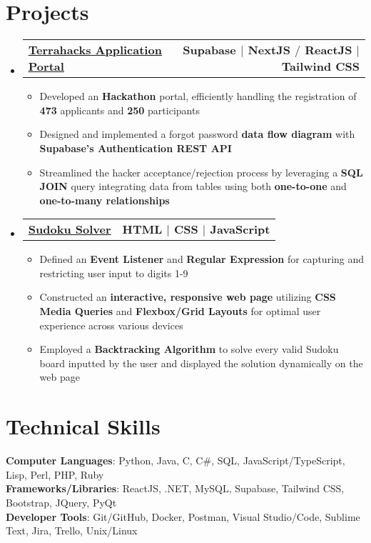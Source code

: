 \documentclass[letterpaper,11pt]{article}
\makeatletter
\newcommand{\resumeItem}[1]{
  \item\small{
    {#1 \vspace{-2pt}}
  }
}
\newcommand{\resumeProjectHeading}[2]{
    \item
    \begin{tabular*}{1.00\textwidth}{l@{\extracolsep{\fill}}r}
      \small#1 & #2 \\
    \end{tabular*}\vspace{-7pt}
    
}
\newcommand{\resumeSubHeadingListStart}{\begin{itemize}[leftmargin=0.0in, label={}]}
\newcommand{\resumeSubHeadingListEnd}{\end{itemize} \vspace{-18pt}}
\newcommand{\resumeItemListStart}{\begin{itemize}}
\newcommand{\resumeItemListEnd}{\end{itemize}\vspace{-4pt}}
\makeatother
\begin{document}
\section{Projects}
    \resumeSubHeadingListStart
      \vspace{-3pt}
      \resumeProjectHeading
        {
        \textbf{\href{https://portal.terrahacks.ca}
        {\color{blue}\underline{Terrahacks Application Portal}}}
        }{\textbf{Supabase $|$ NextJS $/$ ReactJS $|$ Tailwind CSS}}
        \resumeItemListStart
            \resumeItem{Developed an \textbf{Hackathon} portal, efficiently handling the registration of \textbf{473} applicants and \textbf{250} participants}
            \resumeItem{Designed and implemented a forgot password \textbf{data flow diagram} with \textbf{Supabase's  Authentication REST API}}
            \resumeItem{Streamlined the hacker acceptance/rejection process by leveraging a \textbf{SQL JOIN} query integrating data from tables using both \textbf{one-to-one} and  
            \textbf{one-to-many relationships}}
          \resumeItemListEnd
      \vspace{-7pt}
      \resumeProjectHeading
          {
          \textbf{\href{https://nicholas489.github.io/Sudoku_Solver/}{\color{blue}\underline{Sudoku Solver}}}
          }{\textbf{HTML $|$ CSS $|$ JavaScript}}
          \resumeItemListStart
            \resumeItem{Defined an \textbf{Event Listener} and \textbf{Regular Expression} for capturing and restricting user input to digits 1-9}
            \resumeItem{Constructed an \textbf{interactive, responsive web page} utilizing \textbf{CSS Media Queries} and \textbf{Flexbox/Grid Layouts} for optimal user experience across various devices}
            \resumeItem{Employed a \textbf{Backtracking Algorithm} to solve every valid Sudoku board inputted by the user and displayed the solution dynamically on the web page}
          \resumeItemListEnd
      \vspace{-3pt}
    \resumeSubHeadingListEnd
    
%
\section{Technical Skills}
 \begin{itemize}[leftmargin=0.0in, label={}]
    \small{\item{
     \textbf{Computer Languages}{: Python, Java, C, C\#, SQL, JavaScript/TypeScript, Lisp, Perl, PHP, Ruby} \\
     \textbf{Frameworks/Libraries}{: ReactJS, .NET, MySQL, Supabase, Tailwind CSS, Bootstrap, JQuery, PyQt} \\
     \textbf{Developer Tools}{: Git/GitHub, Docker, Postman, Visual Studio/Code, Sublime Text, Jira, Trello, Unix/Linux}
    }}
 \end{itemize}
\end{document}
